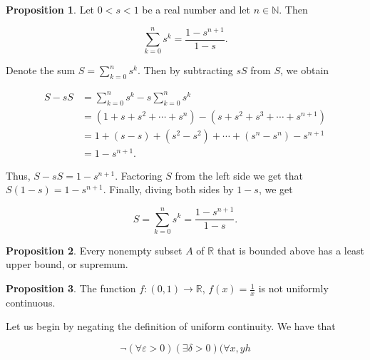 \documentclass{article}
\makeatletter
\theoremstyle{definition}
\newtheorem{prop}{Proposition}[section]
\theoremstyle{remark}
\let\oldproofname=\proofname
\renewcommand{\proofname}{\bf{\textit{\oldproofname}}}
\theoremstyle{definition}
\renewenvironment{proof}[1][\proofname]{\par
  \pushQED{\qed}%
  \normalfont \topsep6\p@\@plus6\p@\relax
  \list{}{\leftmargin=0mm
          \rightmargin=0mm
          \settowidth{\itemindent}{\itshape#1}%
          \labelwidth=\itemindent
          \parsep=0pt \listparindent=0mm%
  }
  \item[\hskip\labelsep
        \itshape
    #1\@addpunct{.}]\ignorespaces
}{%
  \popQED\endlist\@endpefalse
}
\makeatother
\begin{document}
\begin{prop}\label{prop:5.1} 
     Let $0<s<1$ be a real number and let $n\in\mathbb{N}$. Then 
    
    \begin{equation*}
        \sum_{k=0}^{n}s^k=\frac{1-s^{n+1}}{1-s}.
    \end{equation*}
\end{prop}
    
    \begin{proof}  Denote the sum $S=\sum_{k=0}^{n}s^k$. Then by subtracting $sS$ from $S$, we obtain
    
        \begin{equation}
            \begin{split}
                S-sS&=\sum_{k=0}^{n}s^k-s\sum_{k=0}^{n}s^k \\
                &=(1+s+s^2+\cdots+s^n)-(s+s^2+s^3+\cdots+s^{n+1}) \\
                &= 1+(s-s)+(s^2-s^2)+\cdots+(s^n-s^n)-s^{n+1} \\
                &= 1-s^{n+1}.
            \end{split}
        \end{equation}
    
        Thus, $S-sS=1-s^{n+1}$. Factoring $S$ from the left side we get that $S(1-s)=1-s^{n+1}$. Finally, diving both sides by $1-s$, we get 
    
        \begin{equation*}
        S=\sum_{k=0}^{n} s^k=\frac{1-s^{n+1}}{1-s}.
        \end{equation*}
    \end{proof}
        
    \begin{prop}\label{prop:5.2}
        Every nonempty subset $A$ of $\mathbb{R}$ that is bounded above has a least upper bound, or supremum.
    \end{prop}
    
    \newpage
    
    \begin{prop}
         The function $f\colon (0,1)\rightarrow\mathbb{R}$, $f(x)=\frac{1}{x}$ is not uniformly continuous.
    \end{prop} 
    
    \begin{proof}
        Let us begin by negating the definition of uniform continuity. We have that 
        
        \begin{equation*}
            \neg(\forall \varepsilon>0)(\exists\delta>0)(\forall x,yh
        \end{equation*}
    \end{proof}
\end{document}
